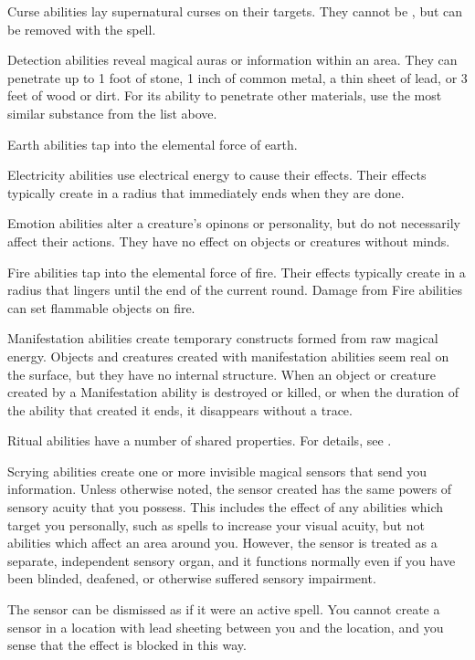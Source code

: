    Curse abilities lay supernatural curses on their targets.
  They cannot be , but can be removed with the  spell.

  \label{Detection} Detection abilities reveal magical auras or information within an area.
  They can penetrate up to 1 foot of stone, 1 inch of common metal, a thin sheet of lead, or 3 feet of wood or dirt.
  For its ability to penetrate other materials, use the most similar substance from the list above.

   Earth abilities tap into the elemental force of earth.

   Electricity abilities use electrical energy to cause their effects.
  Their effects typically create  in a \smallarea radius that immediately ends when they are done.

   Emotion abilities alter a creature's opinons or personality, but do not necessarily affect their actions.
  They have no effect on objects or creatures without minds.

   Fire abilities tap into the elemental force of fire.
  Their effects typically create  in a \smallarea radius that lingers until the end of the current round.
  Damage from Fire abilities can set flammable objects on fire.

   Manifestation abilities create temporary constructs formed from raw magical energy.
  Objects and creatures created with manifestation abilities seem real on the surface, but they have no internal structure.
  When an object or creature created by a Manifestation ability is destroyed or killed, or when the duration of the ability that created it ends, it disappears without a trace.

   Ritual abilities have a number of shared properties.
  For details, see .

   Scrying abilities create one or more invisible magical sensors that send you information.
  Unless otherwise noted, the sensor created has the same powers of sensory acuity that you possess.
  This includes the effect of any abilities which target you personally, such as spells to increase your visual acuity, but not abilities which affect an area around you.
  However, the sensor is treated as a separate, independent sensory organ, and it functions normally even if you have been blinded, deafened, or otherwise suffered sensory impairment.
  \par The sensor can be dismissed as if it were an active spell.
  You cannot create a sensor in a location with lead sheeting between you and the location, and you sense that the effect is blocked in this way.

